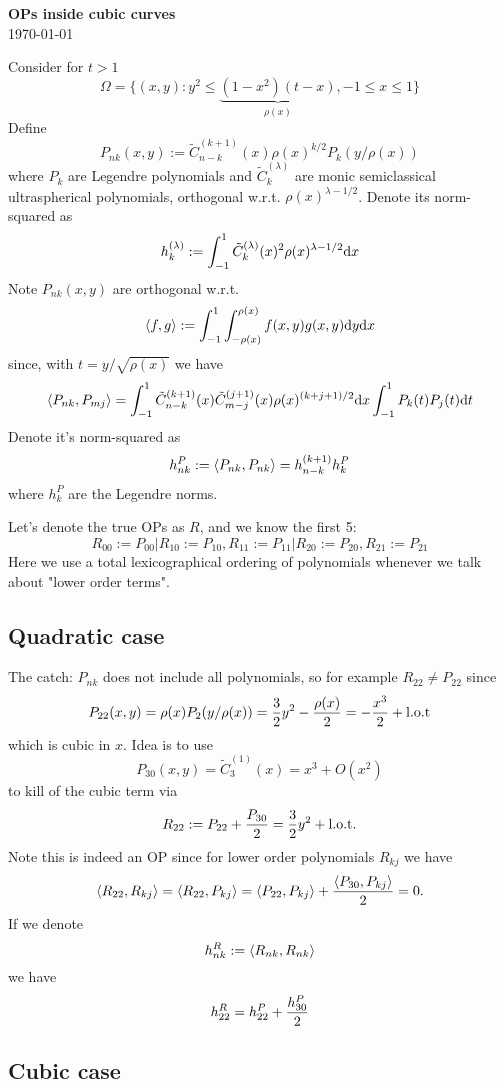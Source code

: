 \documentclass[12pt,a4paper]{article}
\begin{document}
\begin{center}
{\Large \textbf{OPs inside cubic curves}}\\
{\footnotesize \today}
\end{center}

\def\C{\tilde C}

Consider for $t > 1$
$$
\Omega = \{ (x,y) : y^2 \leq \underbrace{(1-x^2) (t-x)}_{\rho(x)}, -1 \leq x \leq 1\}
$$
Define
$$
P_{nk}(x,y) := \C_{n-k}^{(k+1)}(x) \rho(x)^{k/2} P_k(y/\rho(x))
$$
where $P_k$ are Legendre polynomials and $\C_k^{(\lambda)}$ are monic semiclassical ultraspherical polynomials, orthogonal w.r.t. $\rho(x)^{\lambda-1/2}$. Denote its norm-squared as
$$
h_k^{(\lambda)} := \int_{-1}^1 \C_k^{(\lambda)}(x)^2 \rho(x)^{\lambda-1/2} \D x
$$
Note $P_{nk}(x,y)$ are orthogonal w.r.t. 
$$
\ip<f,g> := \int_{-1}^1 \int_{-\rho(x)}^{\rho(x)}  f(x,y) g(x,y) \D y \D x
$$
since, with $t = y/\sqrt{\rho(x)}$ we have
$$
\ip<P_{nk},P_{mj}> = \int_{-1}^1 \C_{n-k}^{(k+1)}(x) \C_{m-j}^{(j+1)}(x)  \rho(x)^{(k+j+1)/2} \D x \int_{-1}^1 P_k(t) P_j(t) \D t
$$
Denote it's norm-squared as
$$
h_{nk}^P := \ip<P_{nk},P_{nk}> = h_{n-k}^{(k+1)} h_k^P
$$
where $h_k^P$ are the Legendre norms.


Let's denote the true OPs as $R$, and we know the first 5:
$$
R_{00} := P_{00} | R_{10} := P_{10}, R_{11} := P_{11} | R_{20} := P_{20}, R_{21} := P_{21}
$$
Here we use a total lexicographical ordering of polynomials whenever we talk about "lower order terms". 

\subsection{Quadratic case}

The catch: $P_{nk}$ does not include all polynomials, so for example $R_{22} \neq P_{22}$ since
$$
P_{22}(x,y) = \rho(x) P_2(y/\rho(x)) = {3 \over 2} y^2 - {\rho(x) \over 2} = -{x^3 \over 2} + {\rm l.o.t}
$$
which is cubic in $x$. Idea is to use 
$$
P_{30}(x,y) = \C_3^{(1)}(x) = x^3 + O(x^2)
$$ 
to kill of the cubic term via
$$
R_{22} := P_{22} + {P_{30} \over 2} = {3\over 2} y^2 + {\rm l.o.t.}
$$
Note this is indeed an OP since for lower order polynomials $R_{kj}$ we have
$$
\ip<R_{22},R_{kj}> = \ip<R_{22},P_{kj}> = \ip<P_{22},P_{kj}> + {\ip<P_{30},P_{kj}> \over 2} = 0.
$$
If we denote
$$
h_{nk}^R := \ip<R_{nk},R_{nk}>
$$
we have
$$
h_{22}^R = h_{22}^P + {h_{30}^P \over 2}
$$

\subsection{Cubic case}
\end{document}

